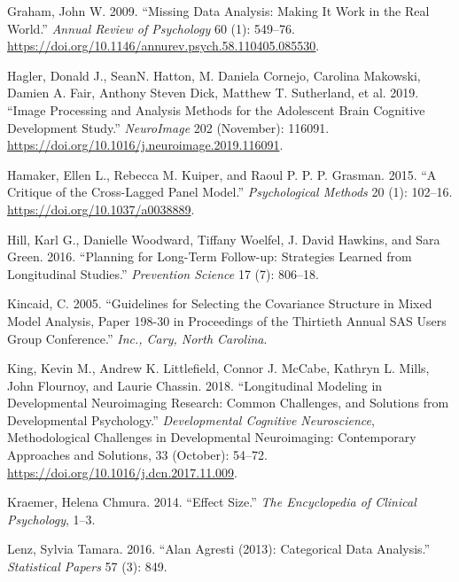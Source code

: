 \documentclass[
  letterpaper,
  DIV=11,
  numbers=noendperiod]{scrartcl}
\newlength{\cslhangindent}
\newlength{\cslentryspacingunit} %
\newenvironment{CSLReferences}[2] %
 {%
  \setlength{\parindent}{0pt}
  \ifodd #1
  \let\oldpar\par
  \def\par{\hangindent=\cslhangindent\oldpar}
  \fi
  \setlength{\parskip}{#2\cslentryspacingunit}
 }%
 {}
\begin{document}
\begin{CSLReferences}{1}{0}
\leavevmode{}%
Graham, John W. 2009. {``Missing {Data} {Analysis}: {Making} {It} {Work}
in the {Real} {World}.''} \emph{Annual Review of Psychology} 60 (1):
549--76. \url{https://doi.org/10.1146/annurev.psych.58.110405.085530}.

\leavevmode{}%
Hagler, Donald J., SeanN. Hatton, M. Daniela Cornejo, Carolina Makowski,
Damien A. Fair, Anthony Steven Dick, Matthew T. Sutherland, et al. 2019.
{``Image Processing and Analysis Methods for the {Adolescent} {Brain}
{Cognitive} {Development} {Study}.''} \emph{NeuroImage} 202 (November):
116091. \url{https://doi.org/10.1016/j.neuroimage.2019.116091}.

\leavevmode{}%
Hamaker, Ellen L., Rebecca M. Kuiper, and Raoul P. P. P. Grasman. 2015.
{``A Critique of the Cross-Lagged Panel Model.''} \emph{Psychological
Methods} 20 (1): 102--16. \url{https://doi.org/10.1037/a0038889}.

\leavevmode{}%
Hill, Karl G., Danielle Woodward, Tiffany Woelfel, J. David Hawkins, and
Sara Green. 2016. {``Planning for Long-Term Follow-up: {Strategies}
Learned from Longitudinal Studies.''} \emph{Prevention Science} 17 (7):
806--18.

\leavevmode{}%
Kincaid, C. 2005. {``Guidelines for Selecting the Covariance Structure
in Mixed Model Analysis, Paper 198-30 in {Proceedings} of the
{Thirtieth} {Annual} {SAS} {Users} {Group} {Conference}.''} \emph{Inc.,
Cary, North Carolina}.

\leavevmode{}%
King, Kevin M., Andrew K. Littlefield, Connor J. McCabe, Kathryn L.
Mills, John Flournoy, and Laurie Chassin. 2018. {``Longitudinal Modeling
in Developmental Neuroimaging Research: {Common} Challenges, and
Solutions from Developmental Psychology.''} \emph{Developmental
Cognitive Neuroscience}, Methodological {Challenges} in {Developmental}
{Neuroimaging}: {Contemporary} {Approaches} and {Solutions}, 33
(October): 54--72. \url{https://doi.org/10.1016/j.dcn.2017.11.009}.

\leavevmode{}%
Kraemer, Helena Chmura. 2014. {``Effect Size.''} \emph{The Encyclopedia
of Clinical Psychology}, 1--3.

\leavevmode{}%
Lenz, Sylvia Tamara. 2016. {``Alan {Agresti} (2013): {Categorical} Data
Analysis.''} \emph{Statistical Papers} 57 (3): 849.


\end{CSLReferences}
\end{document}
